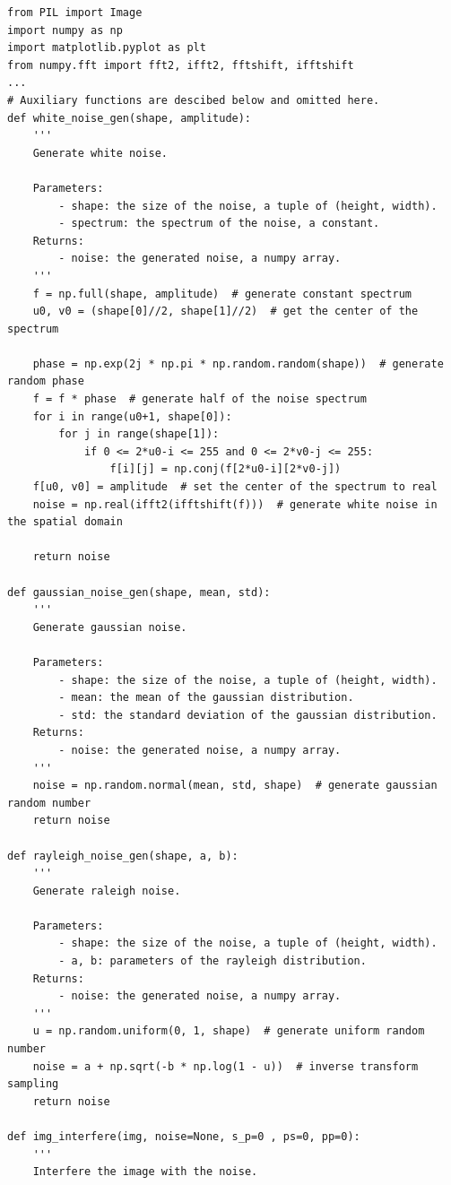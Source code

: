 \documentclass[UTF8]{ctexart}
\begin{document}
\begin{lstlisting}
from PIL import Image
import numpy as np
import matplotlib.pyplot as plt
from numpy.fft import fft2, ifft2, fftshift, ifftshift
...
# Auxiliary functions are descibed below and omitted here.
def white_noise_gen(shape, amplitude):
    '''
    Generate white noise.
    
    Parameters:
        - shape: the size of the noise, a tuple of (height, width).
        - spectrum: the spectrum of the noise, a constant.
    Returns:
        - noise: the generated noise, a numpy array.
    '''
    f = np.full(shape, amplitude)  # generate constant spectrum
    u0, v0 = (shape[0]//2, shape[1]//2)  # get the center of the spectrum
    
    phase = np.exp(2j * np.pi * np.random.random(shape))  # generate random phase
    f = f * phase  # generate half of the noise spectrum
    for i in range(u0+1, shape[0]):
        for j in range(shape[1]):
            if 0 <= 2*u0-i <= 255 and 0 <= 2*v0-j <= 255:
                f[i][j] = np.conj(f[2*u0-i][2*v0-j])
    f[u0, v0] = amplitude  # set the center of the spectrum to real
    noise = np.real(ifft2(ifftshift(f)))  # generate white noise in the spatial domain
    
    return noise

def gaussian_noise_gen(shape, mean, std):
    '''
    Generate gaussian noise.
    
    Parameters:
        - shape: the size of the noise, a tuple of (height, width).
        - mean: the mean of the gaussian distribution.
        - std: the standard deviation of the gaussian distribution.
    Returns:
        - noise: the generated noise, a numpy array.
    '''
    noise = np.random.normal(mean, std, shape)  # generate gaussian random number
    return noise

def rayleigh_noise_gen(shape, a, b):
    '''
    Generate raleigh noise.
    
    Parameters:
        - shape: the size of the noise, a tuple of (height, width).
        - a, b: parameters of the rayleigh distribution.
    Returns:
        - noise: the generated noise, a numpy array.
    '''
    u = np.random.uniform(0, 1, shape)  # generate uniform random number
    noise = a + np.sqrt(-b * np.log(1 - u))  # inverse transform sampling
    return noise

def img_interfere(img, noise=None, s_p=0 , ps=0, pp=0):
    '''
    Interfere the image with the noise.
    

\end{lstlisting}
\end{document}
